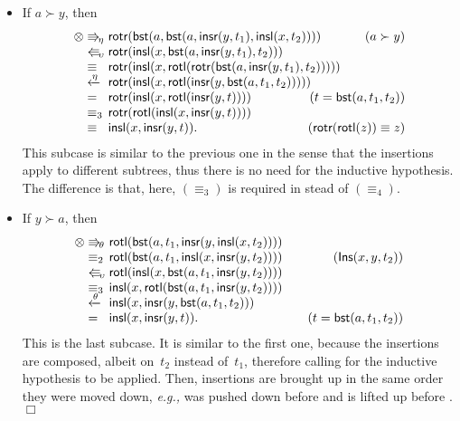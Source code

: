 \begin{itemize}
\begin{itemize}
    \item If \(a \succ y\), then
\begin{equation*}
\begin{array}{@{}r@{\;}l@{\;}l@{\hspace{-9mm}}r@{}}
  \otimes & \Rra{\eta} & \fun{rotr}(\fun{bst}(a,
  \fun{bst}(a,\fun{insr}(y,t_1),\fun{insl}(x,t_2))))
  & (a \succ y)\\
  & \Lla{\upsilon} &
  \fun{rotr}(\fun{insl}(x,\fun{bst}(a,\fun{insr}(y,t_1),t_2)))\\
  & \equiv & \fun{rotr}(\fun{insl}(x, 
  \fun{rotl}(\fun{rotr}(\fun{bst}(a,\fun{insr}(y,t_1),t_2)))))\\
  & \xleftarrow{\smash{\eta}} &
  \fun{rotr}(\fun{insl}(x,\fun{rotl}(\fun{insr}(y, 
  \fun{bst}(a,t_1,t_2)))))\\
  & = & \fun{rotr}(\fun{insl}(x,\fun{rotl}(\fun{insr}(y,t))))
  & (t=\fun{bst}(a,t_1,t_2))\\
  & \equiv_3 &
  \fun{rotr}(\fun{rotl}(\fun{insl}(x,\fun{insr}(y,t))))\\
  & \equiv & \fun{insl}(x,\fun{insr}(y,t)).
  & (\fun{rotr}(\fun{rotl}(z)) \equiv z)
\end{array}
\end{equation*}
This subcase is similar to the previous one in the sense that the
insertions apply to different subtrees, thus there is no need for the
inductive hypothesis. The difference is that, here, \((\equiv_3)\) is
required in stead of \((\equiv_4)\).

  \item If \(y \succ a\), then
\begin{equation*}
\begin{array}{@{}r@{\;}l@{\;}l@{\qquad}r@{}}
  \otimes & \Rra{\theta} & 
  \fun{rotl}(\fun{bst}(a,t_1,\fun{insr}(y,\fun{insl}(x,t_2))))\\
  & \equiv_2 & \fun{rotl}(\fun{bst}(a,t_1,\fun{insl}(x,
  \fun{insr}(y,t_2)))) & (\pred{Ins}{x,y,t_2})\\
  & \Lla{\upsilon} &
  \fun{rotl}(\fun{insl}(x,\fun{bst}(a,t_1,\fun{insr}(y,t_2))))\\
  & \equiv_3 & \fun{insl}(x,\fun{rotl}(\fun{bst}(a,t_1,
  \fun{insr}(y,t_2))))\\
  & \xleftarrow{\smash{\theta}} & \fun{insl}(x,\fun{insr}(y,
  \fun{bst}(a,t_1,t_2)))\\
  & = & \fun{insl}(x,\fun{insr}(y,t)). & (t=\fun{bst}(a,t_1,t_2))
\end{array}
\end{equation*}
This is the last subcase. It is similar to the first one, because the
insertions are composed, albeit on~\(t_2\) instead of~\(t_1\),
therefore calling for the inductive hypothesis to be applied. Then,
insertions are brought up in the same order they were moved down,
\emph{e.g.,}  was pushed down before  and is
lifted up before .\hfill\(\Box\)
  \end{itemize}

\end{itemize}

